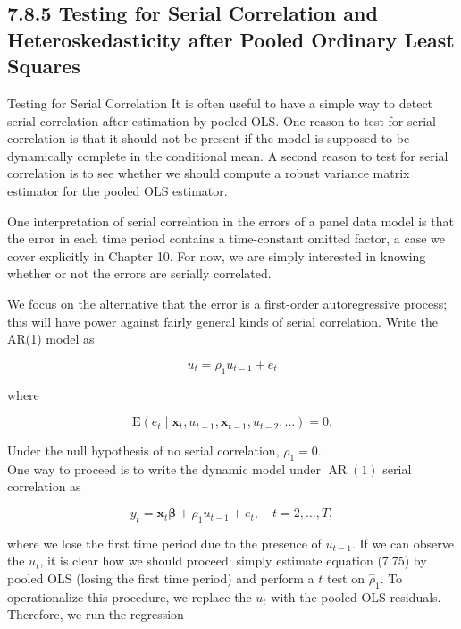 \documentclass[10pt]{article}
\begin{document}
\subsection*{7.8.5 Testing for Serial Correlation and Heteroskedasticity after Pooled Ordinary Least Squares}
Testing for Serial Correlation It is often useful to have a simple way to detect serial correlation after estimation by pooled OLS. One reason to test for serial correlation is that it should not be present if the model is supposed to be dynamically complete in the conditional mean. A second reason to test for serial correlation is to see whether we should compute a robust variance matrix estimator for the pooled OLS estimator.

One interpretation of serial correlation in the errors of a panel data model is that the error in each time period contains a time-constant omitted factor, a case we cover explicitly in Chapter 10. For now, we are simply interested in knowing whether or not the errors are serially correlated.

We focus on the alternative that the error is a first-order autoregressive process; this will have power against fairly general kinds of serial correlation. Write the AR(1) model as


\begin{equation*}
u_{t}=\rho_{1} u_{t-1}+e_{t} \tag{7.79}
\end{equation*}


where


\begin{equation*}
\mathrm{E}\left(e_{t} \mid \mathbf{x}_{t}, u_{t-1}, \mathbf{x}_{t-1}, u_{t-2}, \ldots\right)=0 . \tag{7.80}
\end{equation*}


Under the null hypothesis of no serial correlation, $\rho_{1}=0$.\\
One way to proceed is to write the dynamic model under $\operatorname{AR}(1)$ serial correlation as


\begin{equation*}
y_{t}=\mathbf{x}_{t} \boldsymbol{\beta}+\rho_{1} u_{t-1}+e_{t}, \quad t=2, \ldots, T, \tag{7.81}
\end{equation*}


where we lose the first time period due to the presence of $u_{t-1}$. If we can observe the $u_{t}$, it is clear how we should proceed: simply estimate equation (7.75) by pooled OLS (losing the first time period) and perform a $t$ test on $\hat{\rho}_{1}$. To operationalize this procedure, we replace the $u_{t}$ with the pooled OLS residuals. Therefore, we run the regression
\end{document}
